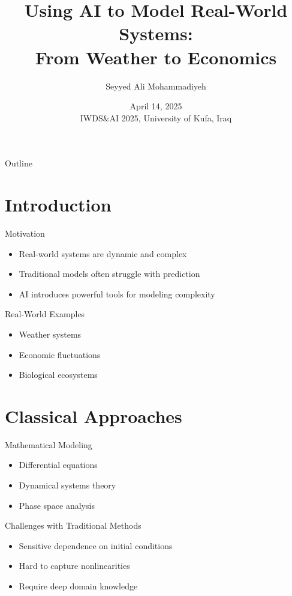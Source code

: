 \documentclass[xcolor=table]{beamer}
\title{Using AI to Model Real-World Systems:\\From Weather to Economics}
\author{Seyyed Ali Mohammadiyeh}
\date{April 14, 2025\\\small IWDS\&AI 2025, University of Kufa, Iraq}
\begin{document}
\begin{frame}
    \titlepage
\end{frame}

\begin{frame}{Outline}
    \tableofcontents
\end{frame}

\section{Introduction}

\begin{frame}{Motivation}
    \begin{itemize}
        \item Real-world systems are dynamic and complex
        \item Traditional models often struggle with prediction
        \item AI introduces powerful tools for modeling complexity
    \end{itemize}
\end{frame}

\begin{frame}{Real-World Examples}
    \begin{itemize}
        \item Weather systems
        \item Economic fluctuations
        \item Biological ecosystems
    \end{itemize}
\end{frame}

\section{Classical Approaches}

\begin{frame}{Mathematical Modeling}
    \begin{itemize}
        \item Differential equations
        \item Dynamical systems theory
        \item Phase space analysis
    \end{itemize}
\end{frame}

\begin{frame}{Challenges with Traditional Methods}
    \begin{itemize}
        \item Sensitive dependence on initial conditions
        \item Hard to capture nonlinearities
        \item Require deep domain knowledge
    \end{itemize}
\end{frame}
\end{document}
